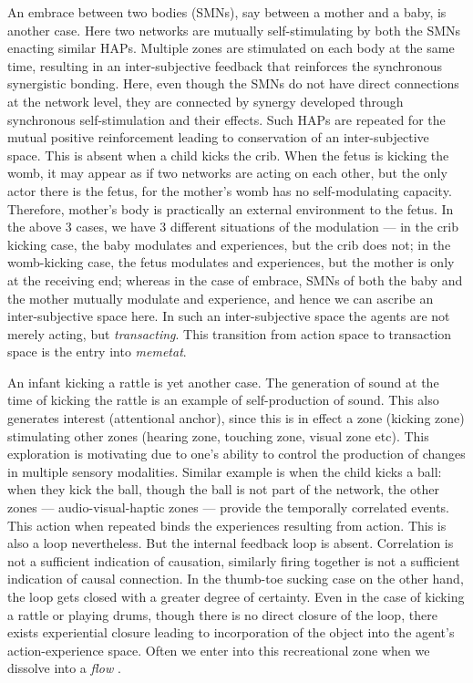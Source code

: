 An embrace between two bodies (SMNs), say between a mother and a baby, is another case. Here two networks are mutually self-stimulating by both the SMNs enacting similar HAPs. Multiple zones are stimulated on each body at the same time, resulting in an inter-subjective feedback that reinforces the synchronous synergistic bonding. Here, even though the SMNs do not have direct connections at the network level, they are connected by synergy developed through synchronous self-stimulation and their effects. Such HAPs are repeated for the mutual positive reinforcement leading to conservation of an inter-subjective space. This is absent when a child kicks the crib. When the fetus is kicking the womb, it may appear as if two networks are acting on each other, but the only actor there is the fetus, for the mother's womb has no self-modulating capacity. Therefore, mother's body is practically an external environment to the fetus. In the above 3 cases, we have 3 different situations of the modulation --- in the crib kicking case, the baby modulates and experiences, but the crib does not; in the womb-kicking case, the fetus modulates and experiences, but the mother is only at the receiving end; whereas in the case of embrace, SMNs of both the baby and the mother mutually modulate and experience, and hence we can ascribe an inter-subjective space here.  In such an inter-subjective space the agents are not merely acting, but \textit{transacting}. This transition from action space to transaction space is the entry into \textit{memetat}. 

An infant kicking a rattle is yet another case. The generation of sound at the time of kicking the rattle is an example of self-production of sound. This also generates interest (attentional anchor), since this is in effect a zone (kicking zone) stimulating other zones (hearing zone, touching zone, visual zone etc). This exploration is motivating due to one's ability to control the production of changes in multiple sensory modalities. Similar example is when the child kicks a ball: when they kick the ball, though the ball is not part of the network, the other zones --- audio-visual-haptic zones --- provide the temporally correlated events. This action when repeated binds the experiences resulting from action. This is also a loop nevertheless. But the internal feedback loop is absent. Correlation is not a sufficient indication of causation, similarly firing together is not a sufficient indication of causal connection. In the thumb-toe sucking case on the other hand, the loop gets closed with a greater degree of certainty. Even in the case of kicking a rattle or playing drums, though there is no direct closure of the loop, there exists experiential closure leading to incorporation of the object into the agent's action-experience space. Often we enter into this recreational zone when we dissolve into a \textit{flow} \cite{Mihaly}. 

